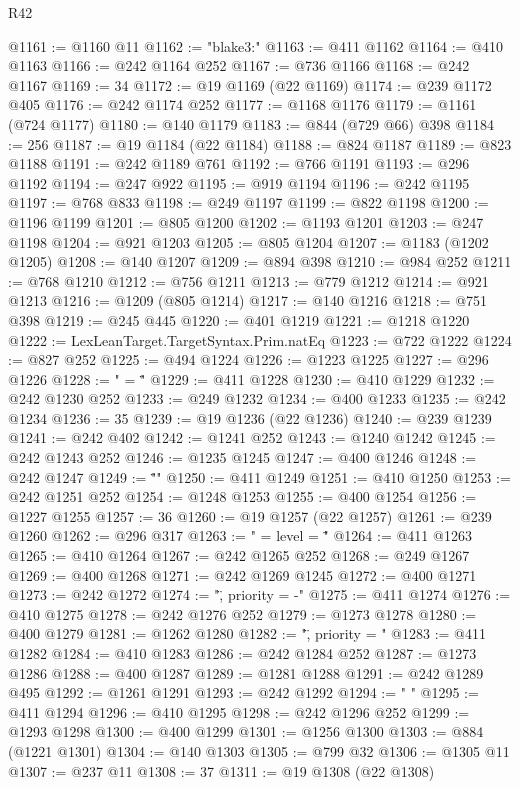 \begin{lexlean}{R42}
\begin{coremodule}
@1161 := @1160 @11
@1162 := "blake3:"
@1163 := @411 @1162
@1164 := @410 @1163
@1166 := @242 @1164 @252
@1167 := @736 @1166
@1168 := @242 @1167
@1169 := 34
@1172 := @19 @1169 (@22 @1169)
@1174 := @239 @1172 @405
@1176 := @242 @1174 @252
@1177 := @1168 @1176
@1179 := @1161 (@724 @1177)
@1180 := @140 @1179
@1183 := @844 (@729 @66) @398
@1184 := 256
@1187 := @19 @1184 (@22 @1184)
@1188 := @824 @1187
@1189 := @823 @1188
@1191 := @242 @1189 @761
@1192 := @766 @1191
@1193 := @296 @1192
@1194 := @247 @922
@1195 := @919 @1194
@1196 := @242 @1195
@1197 := @768 @833
@1198 := @249 @1197
@1199 := @822 @1198
@1200 := @1196 @1199
@1201 := @805 @1200
@1202 := @1193 @1201
@1203 := @247 @1198
@1204 := @921 @1203
@1205 := @805 @1204
@1207 := @1183 (@1202 @1205)
@1208 := @140 @1207
@1209 := @894 @398
@1210 := @984 @252
@1211 := @768 @1210
@1212 := @756 @1211
@1213 := @779 @1212
@1214 := @921 @1213
@1216 := @1209 (@805 @1214)
@1217 := @140 @1216
@1218 := @751 @398
@1219 := @245 @445
@1220 := @401 @1219
@1221 := @1218 @1220
@1222 := LexLeanTarget.TargetSyntax.Prim.natEq
@1223 := @722 @1222
@1224 := @827 @252
@1225 := @494 @1224
@1226 := @1223 @1225
@1227 := @296 @1226
@1228 := " = \""
@1229 := @411 @1228
@1230 := @410 @1229
@1232 := @242 @1230 @252
@1233 := @249 @1232
@1234 := @400 @1233
@1235 := @242 @1234
@1236 := 35
@1239 := @19 @1236 (@22 @1236)
@1240 := @239 @1239
@1241 := @242 @402
@1242 := @1241 @252
@1243 := @1240 @1242
@1245 := @242 @1243 @252
@1246 := @1235 @1245
@1247 := @400 @1246
@1248 := @242 @1247
@1249 := "\"\n"
@1250 := @411 @1249
@1251 := @410 @1250
@1253 := @242 @1251 @252
@1254 := @1248 @1253
@1255 := @400 @1254
@1256 := @1227 @1255
@1257 := 36
@1260 := @19 @1257 (@22 @1257)
@1261 := @239 @1260
@1262 := @296 @317
@1263 := " = { level = \""
@1264 := @411 @1263
@1265 := @410 @1264
@1267 := @242 @1265 @252
@1268 := @249 @1267
@1269 := @400 @1268
@1271 := @242 @1269 @1245
@1272 := @400 @1271
@1273 := @242 @1272
@1274 := "\", priority = -"
@1275 := @411 @1274
@1276 := @410 @1275
@1278 := @242 @1276 @252
@1279 := @1273 @1278
@1280 := @400 @1279
@1281 := @1262 @1280
@1282 := "\", priority = "
@1283 := @411 @1282
@1284 := @410 @1283
@1286 := @242 @1284 @252
@1287 := @1273 @1286
@1288 := @400 @1287
@1289 := @1281 @1288
@1291 := @242 @1289 @495
@1292 := @1261 @1291
@1293 := @242 @1292
@1294 := " }\n"
@1295 := @411 @1294
@1296 := @410 @1295
@1298 := @242 @1296 @252
@1299 := @1293 @1298
@1300 := @400 @1299
@1301 := @1256 @1300
@1303 := @884 (@1221 @1301)
@1304 := @140 @1303
@1305 := @799 @32
@1306 := @1305 @11
@1307 := @237 @11
@1308 := 37
@1311 := @19 @1308 (@22 @1308)

\end{coremodule}
\end{lexlean}
